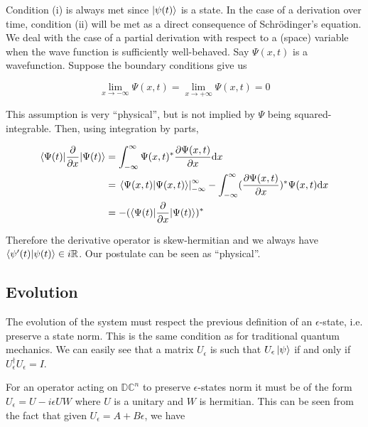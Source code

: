 \documentclass{article}
\newcommand{\R}{\mathbb{R}}
\newcommand{\DC}{\mathbb{DC}}
\newcommand{\e}{\epsilon}
\begin{document}
Condition (i) is always met since $\ket{\psi(t)}$ is a state. In the case of a derivation over time, condition (ii) will be met as a direct consequence of Schrödinger's equation. We deal with the case of a partial derivation with respect to a (space) variable when the wave function is sufficiently well-behaved. Say $\Psi(x, t)$ is a wavefunction. Suppose the boundary conditions give us

\begin{equation}
 \lim_{x \to -\infty} \Psi(x, t) = \lim_{x \to +\infty} \Psi(x, t) = 0
\end{equation}

This assumption is very ``physical'', but is not implied by $\Psi$ being squared-integrable. Then, using integration by parts,

\begin{equation}
\begin{split}
 \braket{\Psi(t) | \frac{\partial}{\partial x} | \Psi(t)} &= \int_{-\infty}^\infty \Psi(x, t)^* \frac{\partial \Psi(x, t)}{\partial x} \mathrm{d}x\\
 &= \left. \braket{\Psi(x, t)|\Psi(x, t)} \right|_{-\infty}^\infty - \int_{-\infty}^\infty (\frac{\partial \Psi(x, t)}{\partial x})^* \Psi(x, t) \mathrm{d}x\\
 &= - (\braket{\Psi(t) | \frac{\partial}{\partial x} | \Psi(t)})^*
\end{split}
\end{equation}

Therefore the derivative operator is skew-hermitian and we always have $\braket{\psi'(t) | \psi(t)} \in i\R$. Our postulate can be seen as ``physical''.

\subsection{Evolution}

The evolution of the system must respect the previous definition of an $\e$-state, i.e. preserve a state norm. This is the same condition as for traditional quantum mechanics. We can easily see that a matrix $U_\e$ is such that $U_\e \ket{\psi}$ if and only if $U_\e^\dagger U_\e = I$.

For an operator acting on $\DC^n$ to preserve $\e$-states norm it must be of the form $U_\e = U - i \e U W$ where $U$ is a unitary and $W$ is hermitian. This can be seen from the fact that given $U_\e = A + B\e$, we have
\end{document}
